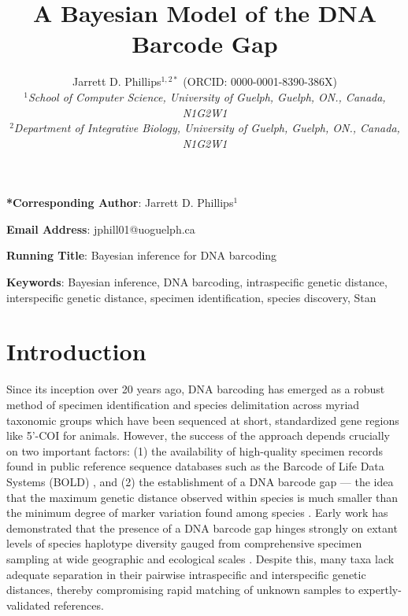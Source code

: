 \documentclass[12pt]{article}
\makeatletter
\renewcommand{\maketitle}{\bgroup\setlength{\parindent}{0pt}
\begin{flushleft}
\textbf{\@title}

  \@author
\end{flushleft}\egroup
}
\makeatother
\begin{document}
\linenumbers

\title{A Bayesian Model of the DNA Barcode Gap}

\author{Jarrett D. Phillips$^{1, 2*}$ (ORCID: 0000-0001-8390-386X)  \\
\textit{$^1$School of Computer Science, University of Guelph, Guelph, ON., Canada, N1G2W1} \\ \textit{$^2$Department of Integrative Biology, University of Guelph, Guelph, ON., Canada, N1G2W1} }

\date{}

\maketitle

\vspace{2mm}

\noindent \textbf{*Corresponding Author}: Jarrett D. Phillips$^{1}$

\noindent \textbf{Email Address}: jphill01@uoguelph.ca

\noindent \textbf{Running Title}: Bayesian inference for DNA barcoding

\newpage

\begin{abstract}

\end{abstract}

\textbf{Keywords}: Bayesian inference, DNA barcoding, intraspecific genetic distance, \\ interspecific genetic distance, specimen identification, species discovery, Stan 

\vspace{2mm}

\section{Introduction}

Since its inception over 20 years ago, DNA barcoding \citep{hebert2003biological, hebert2003barcoding} has emerged as a robust method of specimen identification and species delimitation across myriad \\ taxonomic groups which have been sequenced at short, standardized gene regions like 5'-COI for animals. However, the success of the approach depends crucially on two important factors: (1) the availability of high-quality specimen records found in public reference sequence databases such as the Barcode of Life Data Systems (BOLD) \citep{ratnasingham2007bold}, and (2) the establishment of a DNA barcode gap --- the idea that the maximum genetic distance observed within species is much smaller than the minimum degree of marker variation found among species \citep{meyer2005dna, meier2008use}. Early work has demonstrated that the presence of a DNA barcode gap hinges strongly on extant levels of species haplotype diversity gauged from comprehensive specimen sampling at wide geographic and ecological scales \citep{bergsten2012effect}. Despite this, many taxa lack adequate separation in their pairwise intraspecific and interspecific genetic distances, thereby compromising rapid matching of unknown samples to expertly-validated references.
\end{document}
